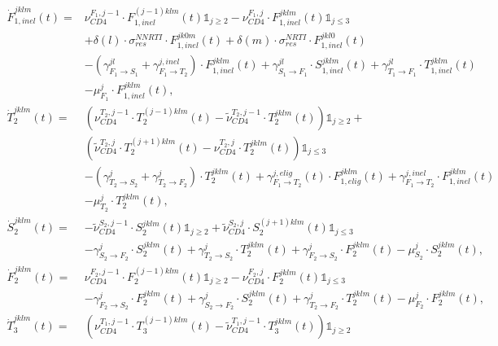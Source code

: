\documentclass{article}
\begin{document}
\begin{align*}
  \dot{F}_{1,inel}^{jklm}(t) =&\nu_{CD4}^{F_1,j-1}\cdot F_{1,inel}^{(j-1)klm}(t)\mathbb{1}_{j\geq 2}-\nu_{CD4}^{F_1,j}\cdot F_{1,inel}^{jklm}(t)\mathbb{1}_{j\leq 3}\\
  &+\delta(l)\cdot\sigma_{res}^{NNRTI}\cdot F_{1,inel}^{jk0m}(t) +\delta(m)\cdot\sigma_{res}^{NRTI}\cdot F_{1,inel}^{jkl0}(t)\\
 &-(\gamma^{jl}_{F_1\rightarrow S_1}+\gamma^{j,inel}_{F_1\rightarrow T_2}
 )\cdot F_{1,inel}^{jklm}(t)+\gamma^{jl}_{S_1\rightarrow F_1}\cdot S_{1,inel}^{jklm}(t)+\gamma^{jl}_{T_1\rightarrow F_1}\cdot T_{1,inel}^{jklm}(t)\\
 &-\mu_{F_1}^{j}\cdot F_{1,inel}^{jklm}(t),\\[16pt]
  \dot{T}_{2}^{jklm}(t) =&\left(\nu_{CD4}^{T_2,j-1}\cdot T_2^{(j-1)klm}(t)-\tilde{\nu}_{CD4}^{T_2,j-1}\cdot T_2^{jklm}(t)\right)\mathbb{1}_{j\geq 2}+\\
  &\left(\tilde{\nu}_{CD4}^{T_2,j}\cdot T_2^{(j+1)klm}(t)-\nu_{CD4}^{T_2,j}\cdot T_2^{jklm}(t) \right)\mathbb{1}_{j\leq 3}\\
  &-(\gamma^{j}_{T_2\rightarrow S_2}+\gamma^{j}_{T_2\rightarrow F_2})\cdot T_2^{jklm}(t)+\gamma^{j,elig}_{F_1\rightarrow T_2}(t)\cdot  F_{1,elig}^{jklm} (t)+\gamma^{j,inel}_{F_1\rightarrow T_2}\cdot  F_{1,inel}^{jklm} (t)\\
  &-\mu_{T_2}^{j}\cdot T_2^{jklm}(t),\\[16pt]
  \dot{S}_{2}^{jklm}(t) =& -\tilde{\nu}_{CD4}^{S_2,j-1}\cdot S_2^{jklm}(t)\mathbb{1}_{j\geq 2}+\tilde{\nu}_{CD4}^{S_2,j}\cdot S_2^{(j+1)klm}(t)\mathbb{1}_{j\leq 3}\\
  &-\gamma^{j}_{S_2\rightarrow F_2}\cdot S_2^{jklm}(t)+\gamma^{j}_{T_2\rightarrow S_2}\cdot T_2^{jklm}(t)+\gamma^{j}_{F_2\rightarrow S_2}\cdot F_2^{jklm}(t)-\mu_{S_2}^{j}\cdot S_2^{jklm}(t),\\[16pt]
  \dot{F}_{2}^{jklm}(t) =&\nu_{CD4}^{F_2,j-1}\cdot F_2^{(j-1)klm}(t)\mathbb{1}_{j\geq 2}-\nu_{CD4}^{F_2,j}\cdot F_2^{jklm}(t)\mathbb{1}_{j\leq 3}\\
  &-\gamma^{j}_{F_2\rightarrow S_2}\cdot F_2^{jklm}(t)+\gamma^{j}_{S_2\rightarrow F_2}\cdot S_2^{jklm}(t)+\gamma^{j}_{T_2\rightarrow F_2}\cdot T_2^{jklm}(t)-\mu_{F_2}^{j}\cdot F_2^{jklm}(t),\\[16pt]
  \dot{T}_{3}^{jklm}(t) =& \left(\nu_{CD4}^{T_1,j-1}\cdot T_3^{(j-1)klm}(t)-\tilde{\nu}_{CD4}^{T_1,j-1}\cdot T_3^{jklm}(t)\right)\mathbb{1}_{j\geq 2}\\

\end{align*}
\end{document}
